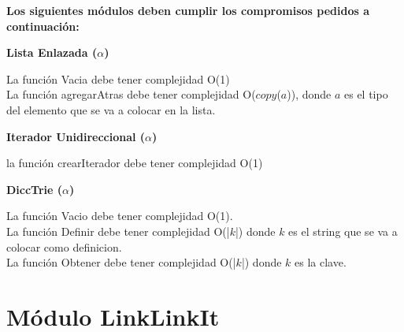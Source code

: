 \documentclass[10pt, a4paper]{article}
\newenvironment{Servicios Usados}{%
  \vspace*{2ex}
  \noindent\textbf{\Large Servicios Usados}%
  \vspace*{2ex}
}{}
\newenvironment{Algoritmos Del Iterador}{%
  \vspace*{2ex}%
  \noindent\textbf{\Large Algoritmos Del Iterador}%
  \vspace*{2ex}%
}{}
\newcommand{\modTitulo}[1]{
  \vspace*{1ex}\par\noindent\textbf{\large #1}\par
}
\begin{document}
\begin{Servicios Usados}

\textbf{Los siguientes m\'odulos deben cumplir los compromisos pedidos a continuaci\'on:}

\modTitulo{Lista Enlazada ($\alpha$)}

La función Vacia debe tener complejidad O(1)\\
La función agregarAtras debe tener complejidad O($copy$($a$)), donde $a$ es el tipo del elemento que se va a colocar en la lista.

\modTitulo{Iterador Unidireccional ($\alpha$)}

la función crearIterador debe tener complejidad O(1) 

\modTitulo{DiccTrie ($\alpha$)}

La función Vacio debe tener complejidad O(1). \\
La función Definir debe tener complejidad O(|$k$|) donde $k$ es el string que se va a colocar como definicion. \\
La función Obtener debe tener complejidad O(|$k$|) donde $k$ es la clave.

\end{Servicios Usados}

\section{M\'odulo LinkLinkIt}
\end{document}
